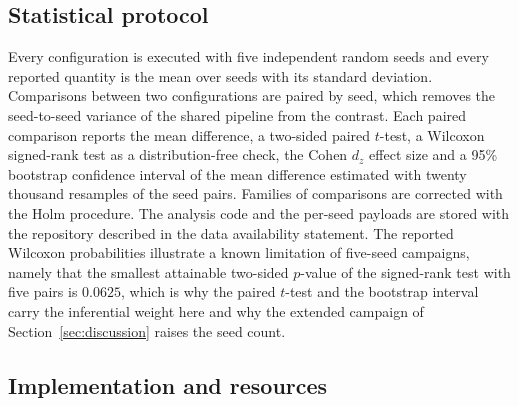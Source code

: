 \documentclass[preprint,number,sort&compress]{elsarticle}
\begin{document}
\subsection{Statistical protocol}

Every configuration is executed with five independent random seeds and every
reported quantity is the mean over seeds with its standard deviation.
Comparisons between two configurations are paired by seed, which removes the
seed-to-seed variance of the shared pipeline from the contrast. Each paired
comparison reports the mean difference, a two-sided paired $t$-test, a
Wilcoxon signed-rank test as a distribution-free check, the Cohen $d_z$
effect size and a 95\% bootstrap confidence interval of the mean difference
estimated with twenty thousand resamples of the seed pairs. Families of
comparisons are corrected with the Holm procedure. The analysis code and the
per-seed payloads are stored with the repository described in the data
availability statement. The reported Wilcoxon probabilities illustrate a
known limitation of five-seed campaigns, namely that the smallest attainable
two-sided $p$-value of the signed-rank test with five pairs is $0.0625$,
which is why the paired $t$-test and the bootstrap interval carry the
inferential weight here and why the extended campaign of
Section~\ref{sec:discussion} raises the seed count.

\subsection{Implementation and resources}
\end{document}
